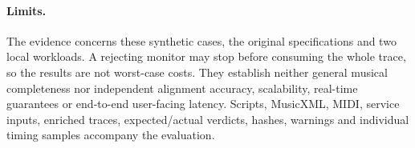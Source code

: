 \paragraph{Limits.}
The evidence concerns these synthetic cases, the original specifications and
two local workloads. A rejecting monitor may stop before consuming the whole
trace, so the results are not worst-case costs. They establish neither general
musical completeness nor independent alignment accuracy, scalability,
real-time guarantees or end-to-end user-facing latency. Scripts, MusicXML,
MIDI, service inputs, enriched traces, expected/actual verdicts, hashes,
warnings and individual timing samples accompany the evaluation.
